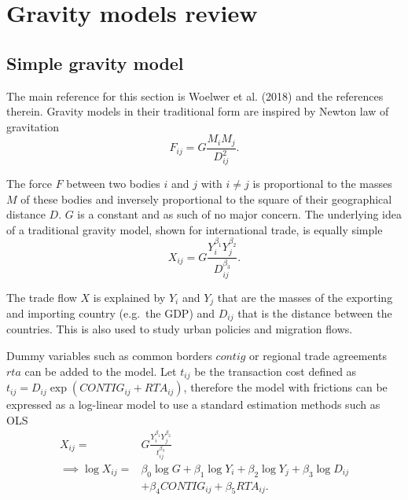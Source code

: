 \documentclass[12pt,reqno,oneside,pdftex]{formato-puc/puctesis} %
\begin{document}
\hypertarget{gravity-models-review}{%
\section{Gravity models review}\label{gravity-models-review}}

\hypertarget{simple-gravity-model}{%
\subsection{Simple gravity model}\label{simple-gravity-model}}

The main reference for this section is Woelwer et al. (2018) and the
references therein. Gravity models in their traditional form are
inspired by Newton law of gravitation \begin{equation*}
F_{ij}=G\frac{M_{i}M_{j}}{D^{2}_{ij}}.
\end{equation*}

The force \(F\) between two bodies \(i\) and \(j\) with \(i \neq j\) is
proportional to the masses \(M\) of these bodies and inversely
proportional to the square of their geographical distance \(D\). \(G\)
is a constant and as such of no major concern. The underlying idea of a
traditional gravity model, shown for international trade, is equally
simple \begin{equation*}
X_{ij}=G\frac{Y_{i}^{\beta_{1}}Y_{j}^{\beta_{2}}}{D_{ij}^{\beta_{3}}}.
\end{equation*}

The trade flow \(X\) is explained by \(Y_{i}\) and \(Y_{j}\) that are
the masses of the exporting and importing country (e.g.~the GDP) and
\(D_{ij}\) that is the distance between the countries. This is also used
to study urban policies and migration flows.

Dummy variables such as common borders \(contig\) or regional trade
agreements \(rta\) can be added to the model. Let \(t_{ij}\) be the
transaction cost defined as
\(t_{ij}= D_{ij} \exp(CONTIG_{ij} + RTA_{ij})\), therefore the model
with frictions can be expressed as a log-linear model to use a standard
estimation methods such as OLS \begin{align*}
X_{ij} =& G\frac{Y_{i}^{\beta_{1}}Y_{j}^{\beta_{2}}}{t_{ij}^{\beta_{3}}} \\
\implies \log X_{ij} =& \beta_{0}\log G +\beta_{1}\log Y_{i}+\beta_{2}\log Y_{j}+\beta_{3}\log D_{ij}\\
&+ \beta_{4}CONTIG_{ij}+\beta_{5}RTA_{ij}.
\end{align*}
\end{document}
